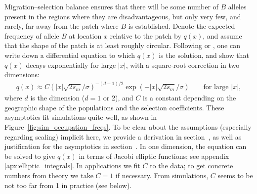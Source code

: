 \documentclass{article}
\newcommand{\citet}[1]{\cite{#1}}
\begin{document}
Migration--selection balance ensures that 
there will be some number of $B$ alleles present in the regions where they are disadvantageous,
but only very few, and rarely, far away from the patch where $B$ is established.
Denote the expected frequency of allele $B$ at location $x$ relative to the patch by $q(x)$,
and assume that the shape of the patch is at least roughly circular.
Following \citet{haldane1948theory} or \citet{slatkin1973geneflow}, one can write down a differential equation to which $q(x)$ is the solution,
and show that $q(x)$ decays exponentially for large $|x|$,
with a square-root correction in two dimensions:
\begin{align} \label{eqn:eqfreq}
  q(x) \approx C \left( |x| \sqrt{2 s_m}/\sigma \right)^{-(d-1)/2} \exp( - |x| \sqrt{2 s_m} / \sigma) \qquad \text{for large $|x|$},
\end{align}
where $d$ is the dimension ($d=1$ or $2$), 
and $C$ is a constant depending on the geographic shape of the populations and the selection coefficients.
These asymptotics fit simulations quite well, as shown in Figure~\ref{fig:sim_occupation_freqs}.
To be clear about the assumptions (especially regarding scaling) implicit here,
we provide a derivation in section~, 
as well as justification for the asymptotics in section~.
In one dimension, the equation can be solved to give $q(x)$ 
in terms of Jacobi elliptic functions; see appendix \ref{apx:elliptic_integrals}.
In applications we fit $C$ to the data;
to get concrete numbers from theory we take $C=1$ if necessary.
From simulations, $C$ seems to be not too far from 1 in practice (see below).
\end{document}
